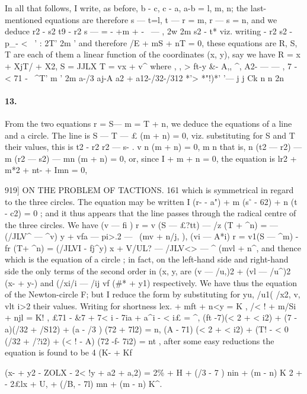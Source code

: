 \documentclass[11pt,a4paper]{book}
\begin{document}
{{{{{In     all    that    follows,    I    write,    as    before,    b  -  c,    c  -  a,    a-b  =  l,    m,    n;    the    last-
mentioned  equations  are  therefore
s  ---  t=l,     t  ---  r  =  m,     r  ---  s  =  n,
and  we  deduce
r2  -  s2  t9  -  r2
s  ---  =  -  +m  +  -~  ---  ,
2w  2m
s2  -  t*
viz.  writing
-  r2  s2  -
p\_-          < 
~'
:
2T'  2m    '
and  therefore
/E  +  mS  +  nT  =  0,
these  equations  are
R,  S,  T  are  each  of  them  a  linear  function  of  the  coordinates  (x,  y),  say  we  have
R  =  x  +  XjT/  +  X2,
S  =  JJLX
T  =  vx  +  v^
where
,     ,      >  ft-y          \&-
A,,  ^,  A2-      ---  ---  ,
7  -<   71  -
~^T'  m      '  2m
a-/3          aj-A       a2  +  a12-/32-/312
*'> *"!)*' '---  j  j  Ck
n  n  2n
\paragraph{13.} From    the    two    equations   r  =  S---  m  =  T +  n,   we   deduce   the    equations   of    a
line  and  a  circle.
The  line  is  S  ---  T  ---  £  (m  +  n)  =  0,  viz.  substituting  for  S  and  T  their  values,  this  is
t2  -  r2     r2  ---  s-     .          v     n
(m  +  n)  =  0,
m  n
that  is,
n  (t2  ---  r2)  ---  m  (r2  ---  s2)  ---  mn  (m  +  n)  =  0,
or,  since  I  +  m  +  n  =  0,  the  equation  is
lr2  +  m*2  +  nt-  +  Imn  =  0,


919]  ON  THE  PROBLEM  OF  TACTIONS.  161
which  is  symmetrical  in  regard  to  the  three  circles.     The  equation  may  be  written
I  (r-  -  a")  +  m  (s$^\circ$  -  62)  +  n  (t~  -  c2)  =  0  ;
and  it  thus  appears  that  the  line  passes  through  the  radical  centre  of  the  three  circles.
We  have
(v  ---  fi  )  r  =  v  (S  ---  £?tt)  ---  /z  (T  +  ^n)  =  ---  (/JLV^  ---  ^v)  y  +  vfa  ---  pi>.2  ---  \  (mv  +  n/j,  ),
(vi  ---  A*i)  r  =  v1(S  ---  ^m)  -  fr  (T+  ^n)  =      (/JLVI  -  fj^y)  x  +  V/UL?  ---  /JLV<>  ---  ^  (mvl  +  n^,
and  thence
which  is  the  equation  of  a  circle  ;  in  fact,  on  the  left-hand  side  and  right-hand  side
the  only  terms  of  the  second  order  in  (x,  y,  are  {(v  ---  /u,)2  +  (vl  ---  /u^)2}  (x-  +  y-)  and
(/xi/i  ---  /ij  vf  (\#*  +  y1)  respectively.  We  have  thus  the  equation  of  the  Newton-circle  F;
but  I  reduce  the  form  by  substituting  for  yu,  /u1(  /x2,  v,  vlt  i>2  their  values.  Writing  for
shortness
lex.  +  mft  +  n<y  =  K  ,
/< !  +  m/Si  +  njl  =  K!  ,
£71  -  \&7  +  7< i  -  7ia  +  a^i  -  < i£  =  ^,
(ft  -7)(< 2  +  < i2)  +  (7  -a)(/32  +  /S12)  +  (a  -  /3  )  (72  +  7l2)  =  n,
(A  -  71)  (< 2  +  < i2)  +  (T!  -  < 0  (/32  +  /?i2)  +  (< !  -  A)  (72  -f-  7i2)  =  nt  ,
after  some  easy  reductions  the  equation  is  found  to  be
4  (K-  +  Kf}  (x-  +  y2  -  ZOLX  -  2< !y  +  a2  +  a,2)
=      {     2\%  +  H  +  (/3  -  7  )  nin  +  (m  -  n)  K  }2
+  {-  2£lx  +  U,  +  (/B,  -  7l)  mn  +  (m  -  n)  K^.
}}}}}
\end{document}
